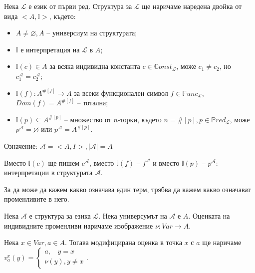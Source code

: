 \documentclass{article}
\begin{document}
\begin{mydef}
Нека $\mathcal{L}$ е език от първи ред. Структура за $\mathcal{L}$ ще наричаме наредена двойка от вида $<A, \mathbb{I}>$, където:
\begin{itemize}
\item $A \neq \varnothing, A$ -- универсиум на структурата;
\item $\mathbb{I}$ е интерпретация на $\mathcal{L}$ в $A$;
\item $\mathbb{I}(c) \in A$ за всяка индивидна константа $c \in \mathbb{C}onst_\mathcal{L}$, може $c_1 \neq c_2$, но $c_1^\mathcal{A} = c_2^\mathcal{A}$;
\item $\mathbb{I}(f) : A^{\#[f]} \longrightarrow A$ за всеки функционален символ $f \in \mathbb{F}unc_\mathcal{L}$, $Dom(f) = A^{\#[f]}$ -- тотална;
\item $\mathbb{I}(p) \subseteq A^{\#[p]}$ -- множество от $n$-торки, където $n = \#[p], p \in \mathbb{P}red_\mathcal{L}$, може $p^\mathcal{A} = \varnothing$ или $p^\mathcal{A} = A^{\#[p]}$.
\end{itemize}

Означение: $\mathcal{A} = <A, I>, |\mathcal{A}| = A$

\begin{remark}
Вместо $\mathbb{I}(c)$ ще пишем $c^\mathcal{A}$, вместо $\mathbb{I}(f)$ -- $f^\mathcal{A}$ и вместо $\mathbb{I}(p)$ -- $p^\mathcal{A}$: интерпретации в структурата $\mathcal{A}$.
\end{remark}

\begin{remark}
За да може да кажем какво означава един терм, трябва да кажем какво означават променливите в него.
\end{remark}

\end{mydef}

\begin{mydef}[Оценка]
Нека $\mathcal{A}$ е структура за езика $\mathcal{L}$. Нека универсумът на $\mathcal{A}$ е $A$. Оценката на индивидните променливи наричаме изображение $\nu: Var \longrightarrow A$.
\end{mydef}

\begin{mydef}
Нека $x \in Var, a \in A$. Тогава модифицирана оценка в точка $x$ с $a$ ще наричаме $v_a^x(y) = \begin{cases}
a, \ \ \ \ y = x\\
\nu(y), y \neq x
\end{cases} $.
\end{mydef}
\end{document}

